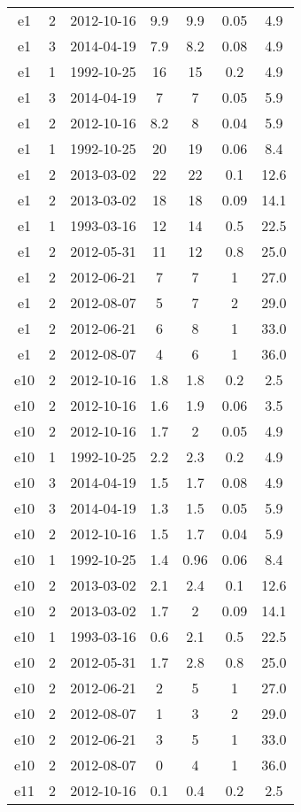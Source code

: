 \begin{table*}[htp]
\begin{tabular}{ccccccc}
e1 & 2 & 2012-10-16 & 9.9 & 9.9 & 0.05 & 4.9 \\
e1 & 3 & 2014-04-19 & 7.9 & 8.2 & 0.08 & 4.9 \\
e1 & 1 & 1992-10-25 & 16 & 15 & 0.2 & 4.9 \\
e1 & 3 & 2014-04-19 & 7 & 7 & 0.05 & 5.9 \\
e1 & 2 & 2012-10-16 & 8.2 & 8 & 0.04 & 5.9 \\
e1 & 1 & 1992-10-25 & 20 & 19 & 0.06 & 8.4 \\
e1 & 2 & 2013-03-02 & 22 & 22 & 0.1 & 12.6 \\
e1 & 2 & 2013-03-02 & 18 & 18 & 0.09 & 14.1 \\
e1 & 1 & 1993-03-16 & 12 & 14 & 0.5 & 22.5 \\
e1 & 2 & 2012-05-31 & 11 & 12 & 0.8 & 25.0 \\
e1 & 2 & 2012-06-21 & 7 & 7 & 1 & 27.0 \\
e1 & 2 & 2012-08-07 & 5 & 7 & 2 & 29.0 \\
e1 & 2 & 2012-06-21 & 6 & 8 & 1 & 33.0 \\
e1 & 2 & 2012-08-07 & 4 & 6 & 1 & 36.0 \\
e10 & 2 & 2012-10-16 & 1.8 & 1.8 & 0.2 & 2.5 \\
e10 & 2 & 2012-10-16 & 1.6 & 1.9 & 0.06 & 3.5 \\
e10 & 2 & 2012-10-16 & 1.7 & 2 & 0.05 & 4.9 \\
e10 & 1 & 1992-10-25 & 2.2 & 2.3 & 0.2 & 4.9 \\
e10 & 3 & 2014-04-19 & 1.5 & 1.7 & 0.08 & 4.9 \\
e10 & 3 & 2014-04-19 & 1.3 & 1.5 & 0.05 & 5.9 \\
e10 & 2 & 2012-10-16 & 1.5 & 1.7 & 0.04 & 5.9 \\
e10 & 1 & 1992-10-25 & 1.4 & 0.96 & 0.06 & 8.4 \\
e10 & 2 & 2013-03-02 & 2.1 & 2.4 & 0.1 & 12.6 \\
e10 & 2 & 2013-03-02 & 1.7 & 2 & 0.09 & 14.1 \\
e10 & 1 & 1993-03-16 & 0.6 & 2.1 & 0.5 & 22.5 \\
e10 & 2 & 2012-05-31 & 1.7 & 2.8 & 0.8 & 25.0 \\
e10 & 2 & 2012-06-21 & 2 & 5 & 1 & 27.0 \\
e10 & 2 & 2012-08-07 & 1 & 3 & 2 & 29.0 \\
e10 & 2 & 2012-06-21 & 3 & 5 & 1 & 33.0 \\
e10 & 2 & 2012-08-07 & 0 & 4 & 1 & 36.0 \\
e11 & 2 & 2012-10-16 & 0.1 & 0.4 & 0.2 & 2.5 \\

\end{tabular}
\end{table*}
